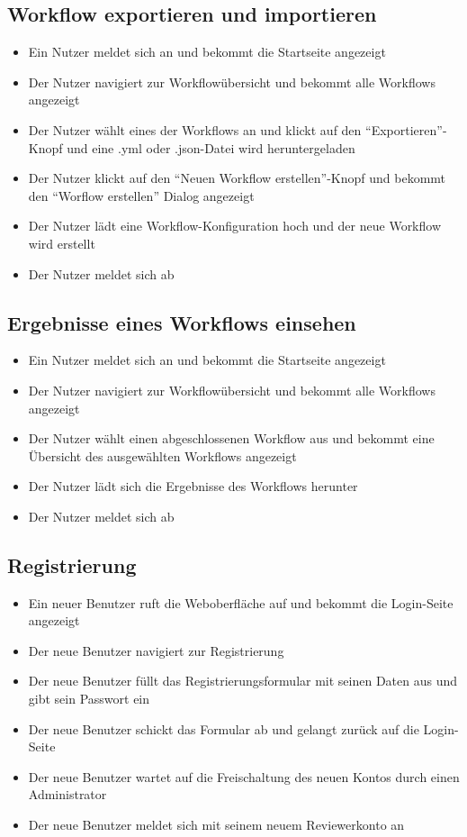 \subsection*{Workflow exportieren und importieren}
\begin{itemize}
    \item Ein \gls{Nutzer} meldet sich an und bekommt die Startseite angezeigt
    \item Der \gls{Nutzer} navigiert zur Workflowübersicht und bekommt alle Workflows angezeigt
    \item Der \gls{Nutzer} wählt eines der Workflows an und klickt auf den \enquote{Exportieren}-Knopf und eine .yml oder .json-Datei wird heruntergeladen
    \item Der \gls{Nutzer} klickt auf den \enquote{Neuen Workflow erstellen}-Knopf und bekommt den \enquote{Worflow erstellen} Dialog angezeigt
    \item Der \gls{Nutzer} lädt eine Workflow-Konfiguration hoch und der neue Workflow wird erstellt
    \item Der \gls{Nutzer} meldet sich ab
\end{itemize}


\subsection*{Ergebnisse eines Workflows einsehen}
\begin{itemize}
    \item Ein \gls{Nutzer} meldet sich an und bekommt die Startseite angezeigt
    \item Der \gls{Nutzer} navigiert zur Workflowübersicht und bekommt alle Workflows angezeigt
    \item Der \gls{Nutzer} wählt einen abgeschlossenen Workflow aus und bekommt eine Übersicht des ausgewählten Workflows angezeigt
    \item Der \gls{Nutzer} lädt sich die Ergebnisse des Workflows herunter
    \item Der \gls{Nutzer} meldet sich ab
\end{itemize}



\subsection*{Registrierung}
\begin{itemize}
    \item Ein neuer Benutzer ruft die Weboberfläche auf und bekommt die Login-Seite angezeigt
    \item Der neue Benutzer navigiert zur Registrierung
    \item Der neue Benutzer füllt das Registrierungsformular mit seinen Daten aus und gibt sein Passwort ein
    \item Der neue Benutzer schickt das Formular ab und gelangt zurück auf die Login-Seite
    \item Der neue Benutzer wartet auf die Freischaltung des neuen Kontos durch einen Administrator
    \item Der neue Benutzer meldet sich mit seinem neuem \Gls{Reviewer}konto an
\end{itemize}

